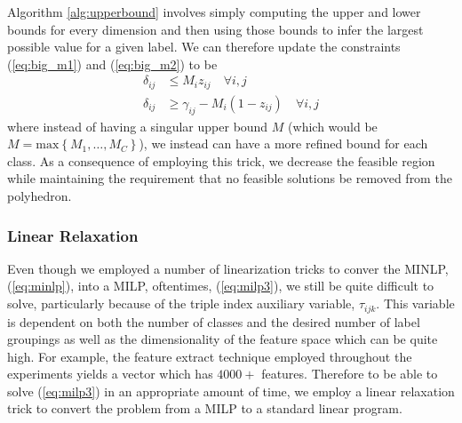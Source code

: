 \documentclass[../thesis.tex]{subfiles}
\begin{document}
Algorithm \ref{alg:upperbound} involves simply computing the upper and lower
bounds for every dimension and then using those bounds to infer the largest
possible value for a given label. We can therefore update the constraints
(\ref{eq:big_m1}) and (\ref{eq:big_m2}) to be
\begin{align}
    \delta_{ij} &\leq M_i z_{ij} \quad \forall i, j \\
    \delta_{ij} &\geq \gamma_{ij} - M_i(1-z_{ij}) \quad \forall i, j
\end{align}
where instead of having a singular upper bound $M$ (which would be $M =
\text{max} \left\{M_1, \ldots, M_C\right\}$), we instead can have a more refined
bound for each class. As a consequence of employing this trick, we decrease the
feasible region while maintaining the requirement that no feasible solutions be
removed from the polyhedron.

\subsubsection{Linear Relaxation}
Even though we employed a number of linearization tricks to conver the MINLP,
(\ref{eq:minlp}), into a MILP, oftentimes, (\ref{eq:milp3}), we still be quite
difficult to solve, particularly because of the triple index auxiliary variable,
$\tau_{ijk}$. This variable is dependent on both the number of classes and the
desired number of label groupings as well as the dimensionality of the feature
space which can be quite high. For example, the feature extract technique
employed throughout the experiments yields a vector which has $4000+$ features.
Therefore to be able to solve (\ref{eq:milp3}) in an appropriate amount of time,
we employ a linear relaxation trick to convert the problem from a MILP to a
standard linear program.
\end{document}

